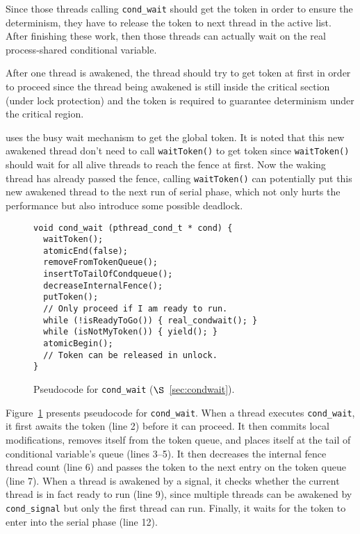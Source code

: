 Since those threads calling \texttt{cond\_wait} should get the token in order
to ensure the determinism, they have to release the token to next
thread in the active list. After finishing these work, then those
threads can actually wait on the real process-shared conditional
variable.

After one thread is awakened, the thread should try to get token at
first in order to proceed since the thread being awakened is 
still inside the critical section (under lock protection)
and the token is required to guarantee determinism under the critical region. 

\dthreads{} uses the busy wait mechanism to get the global token. 
It is noted that this new awakened thread don't need to call \texttt{waitToken()} to get
token since \texttt{waitToken()} should wait for all alive threads to reach the fence at first. 
Now the waking thread has already passed the fence, calling \texttt{waitToken()} can potentially
put this new awakened thread to the next run of serial phase, which not only hurts
the performance but also introduce some possible deadlock.

\begin{figure}
\begin{lstlisting}
void cond_wait (pthread_cond_t * cond) {
  waitToken();
  atomicEnd(false);
  removeFromTokenQueue();
  insertToTailOfCondqueue();
  decreaseInternalFence();
  putToken();
  // Only proceed if I am ready to run.
  while (!isReadyToGo()) { real_condwait(); }
  while (isNotMyToken()) { yield(); } 
  atomicBegin();
  // Token can be released in unlock. 
}
\end{lstlisting}
\caption{Pseudocode for \texttt{cond\_wait} ($\S$~\ref{sec:condwait}). 
\label{fig:condwait}}
\end{figure}

Figure~\ref{fig:condwait} presents pseudocode
for \texttt{cond\_wait}.  When a thread executes \texttt{cond\_wait},
it first awaits the token (line 2) before it can proceed.  It then
commits local modifications, removes itself from the token queue, and
places itself at the tail of conditional variable's queue (lines
3--5). It then decreases the internal fence thread count (line 6) and passes
the token to the next entry on the token queue (line 7). When a thread
is awakened by a signal, it checks whether the current thread is in
fact ready to run (line 9), since multiple threads can be awakened
by \texttt{cond\_signal} but only the first thread can run.  Finally,
it waits for the token to enter into the serial phase (line 12). 

